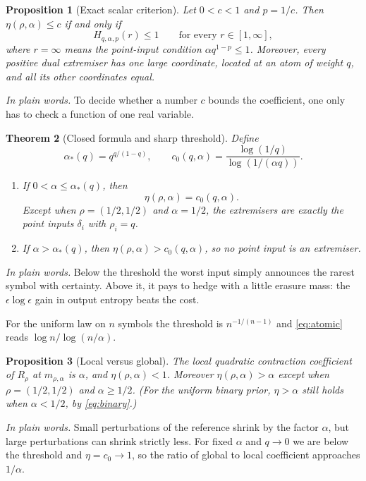 \documentclass[11pt,a4paper]{article}
\numberwithin{equation}{section}
\newtheorem{theorem}{Theorem}[section]
\newtheorem{proposition}[theorem]{Proposition}
\theoremstyle{definition}
\theoremstyle{remark}
\newcommand{\mra}{m_{\rho,\alpha}}
\newcommand{\ac}{\alpha_*}
\newcommand{\plain}[1]{\par\smallskip\noindent\textit{In plain words.} #1\par\smallskip}
\begin{document}
\begin{proposition}[Exact scalar criterion]\label{prop:scalar}
Let \(0<c<1\) and \(p=1/c\). Then \(\eta(\rho,\alpha)\le c\) if and only if
\[
H_{q,\alpha,p}(r)\le1\qquad\text{for every }r\in[1,\infty],
\]
where \(r=\infty\) means the point-input condition \(\alpha q^{1-p}\le1\).
Moreover, every positive dual extremiser has one large coordinate, located at
an atom of weight \(q\), and all its other coordinates equal.
\end{proposition}
\plain{To decide whether a number \(c\) bounds the coefficient, one only has
to check a function of one real variable.}

\begin{theorem}[Closed formula and sharp threshold]\label{thm:phase}
Define
\begin{equation}\label{eq:threshold}
\ac(q)=q^{q/(1-q)},\qquad
c_0(q,\alpha)=\frac{\log(1/q)}{\log(1/(\alpha q))}.
\end{equation}
\begin{enumerate}[label=(\roman*)]
\item If \(0<\alpha\le\ac(q)\), then
\begin{equation}\label{eq:atomic}
\eta(\rho,\alpha)=c_0(q,\alpha).
\end{equation}
Except when \(\rho=(1/2,1/2)\) and \(\alpha=1/2\), the extremisers are
exactly the point inputs \(\delta_i\) with \(\rho_i=q\).
\item If \(\alpha>\ac(q)\), then \(\eta(\rho,\alpha)>c_0(q,\alpha)\), so no
point input is an extremiser.
\end{enumerate}
\end{theorem}
\plain{Below the threshold the worst input simply announces the rarest symbol
with certainty. Above it, it pays to hedge with a little erasure mass:
the \(\epsilon\log\epsilon\) gain in output entropy beats the cost.}

For the uniform law on \(n\) symbols the threshold is \(n^{-1/(n-1)}\) and
\eqref{eq:atomic} reads \(\log n/\log(n/\alpha)\).

\begin{proposition}[Local versus global]\label{prop:local}
The local quadratic contraction coefficient of \(R_\rho\) at \(\mra\) is
\(\alpha\), and \(\eta(\rho,\alpha)<1\). Moreover
\(\eta(\rho,\alpha)>\alpha\) except when \(\rho=(1/2,1/2)\) and
\(\alpha\ge1/2\). (For the uniform binary prior, \(\eta>\alpha\) still holds
when \(\alpha<1/2\), by \eqref{eq:binary}.)
\end{proposition}
\plain{Small perturbations of the reference shrink by the factor \(\alpha\),
but large perturbations can shrink strictly less. For fixed \(\alpha\) and
\(q\to0\) we are below the threshold and \(\eta=c_0\to1\), so the ratio of
global to local coefficient approaches \(1/\alpha\).}
\end{document}
